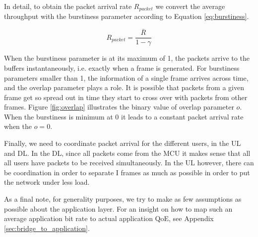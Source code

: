 
In detail, to obtain the packet arrival rate $R_{packet}$ we convert the average throughput with the burstiness parameter according to Equation \eqref{eq:burstiness}.

\begin{equation} \label{eq:burstiness}
    R_{packet} = \frac{\overline{R}}{1 - \gamma}
\end{equation}

When the burstiness parameter is at its maximum of 1, the packets arrive to the buffers instantaneously, i.e. exactly when a frame is generated. For burstiness parameters smaller than 1, the information of a single frame arrives across time, and the overlap parameter plays a role. It is possible that packets from a given frame get so spread out in time they start to cross over with packets from other frames. Figure \ref{fig:overlap} illustrates the binary value of overlap parameter $o$. When the burstiness is minimum at 0 it leads to a constant packet arrival rate when the $o = 0$.



Finally, we need to coordinate packet arrival for the different users, in the \acs{UL} and \acs{DL}. In the \acs{DL}, since all packets come from the \acs{MCU} it makes sense that all all users have packets to be received simultaneously. In the UL however, there can be coordination in order to separate I frames as much as possible in order to put the network under less load.


As a final note, for generality purposes, we try to make as few assumptions as possible about the application layer. For an insight on how to map such an average application bit rate to actual application QoE, see Appendix \ref{sec:bridge_to_application}.